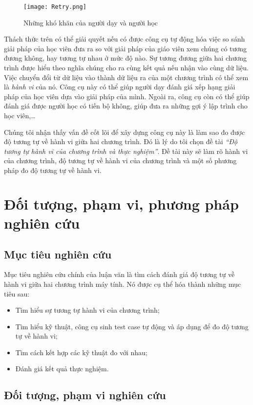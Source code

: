 \begin{figure}[h]
	\centering
	\texttt{[image: Retry.png]}
	\caption{Những khó khăn của người dạy và người học}
	\label{fig:Retry}		
\end{figure}

Thách thức trên có thể giải quyết nếu có được công cụ tự động hóa việc
so sánh giải pháp của học viên đưa ra so với giải pháp của giáo viên
xem chúng có tương đương không, hay tương tự nhau ở mức độ nào. Sự
tương đương giữa hai chương trình được hiểu theo nghĩa chúng cho ra
cùng kết quả nếu nhận vào cùng dữ liệu. Việc chuyển đổi từ dữ liệu vào
thành dữ liệu ra của một chương trình có thể xem là \emph{hành vi} của
nó. Công cụ này có thể giúp người dạy đánh giá xếp hạng giải pháp của
học viên dựa vào giải pháp của mình. Ngoài ra, công cụ còn có thể giúp
đánh giá được người học có tiến bộ không, giúp đưa ra những gợi ý lập
trình cho học viên,\dots

Chúng tôi nhận thấy vấn đề cốt lõi để xây dựng công cụ này là làm sao
đo được độ tương tự về hành vi giữa hai chương trình. Đó là lý do tôi chọn đề tài \emph{``Độ tương tự hành vi của chương trình và thực nghiệm''}. Đề tài này  sẽ làm rõ hành vi của chương trình, độ tương tự về hành vi của chương trình và một số phương pháp đo độ tương tự về hành vi.

\section{Đối tượng, phạm vi, phương pháp nghiên cứu}
\subsection{Mục tiêu nghiên cứu}

Mục tiêu nghiên cứu chính của luận văn là tìm cách đánh giá độ tương tự về hành vi giữa hai chương trình máy tính. Nó được cụ thể hóa thành những mục tiêu sau:
\begin{itemize}
\item Tìm hiểu sự tương tự hành vi của chương trình;
\item Tìm hiểu kỹ thuật, công cụ sinh test case tự động và áp dụng để
  đo độ tương tự về hành vi;
\item Tìm cách kết hợp các kỹ thuật đo với nhau;
\item Đánh giá kết quả thực nghiệm.
\end{itemize}

\subsection{Đối tượng, phạm vi nghiên cứu}

